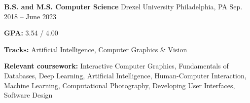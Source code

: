 

\begin{cventries}

  \cventry
  {\textbf{B.S. and M.S. Computer Science}} %
  {Drexel University} %
  {Philadelphia, PA} %
  {Sep. 2018 -- June 2023} %
  {
    \begin{cvitems} %
      \item {\textbf{GPA:} 3.54 / 4.00}
      \item {\textbf{Tracks:} Artificial Intelligence, Computer Graphics \& Vision}
      \item {\color{darktext} \textbf{Relevant coursework:}
                  Interactive Computer Graphics,
                  Fundamentals of Databases,
                  Deep Learning,
                  Artificial Intelligence,
                  Human-Computer Interaction,
                  Machine Learning, 
                  Computational Photography, 
                  Developing User Interfaces,
                  Software Design
            }
    \end{cvitems}}

\end{cventries}

